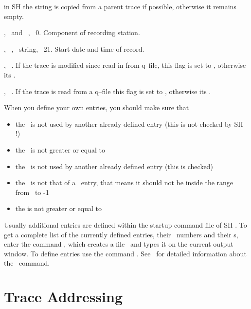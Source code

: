 \begin{deflist}{}
      in SH the string is copied from a parent trace if possible,
      otherwise it remains empty.
   \item[\shi{comp}]
      , \ and \ ,
      \ 0.  Component of
      recording station.
   \item[\shi{start}]
      , \ , \ string,
      \ 21.  Start date and time
      of record.
   \item[\shi{modif}]
      , \ .
      If the trace is modified since read in from q--file, this
      flag is set to , otherwise its .
   \item[\shi{fromq}]
      , \ .
      If the trace is read from a q--file this flag is set to
      , otherwise its .
\end{deflist}

When you define your own entries, you should make sure that
\begin{itemize}
\item  the \ is not used by another already defined
       entry (this is not checked by SH !)
\item  the \ is not greater or equal to 
\item  the \ is not used by another already defined
       entry (this is checked)
\item  the \ is not that of a \ entry,
       that means it should not be inside the range from
       \ to -1
\item  the  is not greater or equal to 
\end{itemize}
Usually additional entries are defined within the startup command
file of SH .  To get a complete list of the currently
defined entries, their \ numbers and their
s, enter the command ,
which creates a file \ and types it on the current
output window.  To define entries use the command .
See \ for detailed information about the \
command.



\section{Trace Addressing}
\label{sec:TraceAdr}

